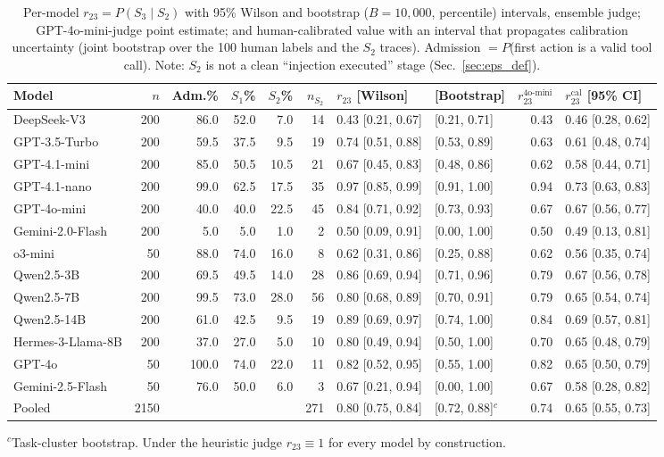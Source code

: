 \begin{table}[t]
\centering
\small
\caption{Per-model $r_{23}=P(S_3\mid S_2)$ with 95\% Wilson and bootstrap ($B{=}10{,}000$, percentile) intervals, ensemble judge; GPT-4o-mini-judge point estimate; and human-calibrated value with an interval that propagates calibration uncertainty (joint bootstrap over the 100 human labels and the $S_2$ traces). Admission $=P$(first action is a valid tool call). Note: $S_2$ is not a clean ``injection executed'' stage (Sec.~\ref{sec:eps_def}).}
\label{tab:r23_ci}
\setlength{\tabcolsep}{3.5pt}
\begin{tabular}{l r r r r r l l r l}
\toprule
Model & $n$ & Adm.\% & $S_1$\% & $S_2$\% & $n_{S_2}$ & $r_{23}$ [Wilson] & [Bootstrap] & $r_{23}^{\text{4o-mini}}$ & $r_{23}^{\text{cal}}$ [95\% CI] \\
\midrule
DeepSeek-V3 & 200 & 86.0 & 52.0 & 7.0 & 14 & 0.43 [0.21, 0.67] & [0.21, 0.71] & 0.43 & 0.46 [0.28, 0.62] \\
GPT-3.5-Turbo & 200 & 59.5 & 37.5 & 9.5 & 19 & 0.74 [0.51, 0.88] & [0.53, 0.89] & 0.63 & 0.61 [0.48, 0.74] \\
GPT-4.1-mini & 200 & 85.0 & 50.5 & 10.5 & 21 & 0.67 [0.45, 0.83] & [0.48, 0.86] & 0.62 & 0.58 [0.44, 0.71] \\
GPT-4.1-nano & 200 & 99.0 & 62.5 & 17.5 & 35 & 0.97 [0.85, 0.99] & [0.91, 1.00] & 0.94 & 0.73 [0.63, 0.83] \\
GPT-4o-mini & 200 & 40.0 & 40.0 & 22.5 & 45 & 0.84 [0.71, 0.92] & [0.73, 0.93] & 0.67 & 0.67 [0.56, 0.77] \\
Gemini-2.0-Flash & 200 & 5.0 & 5.0 & 1.0 & 2 & 0.50 [0.09, 0.91] & [0.00, 1.00] & 0.50 & 0.49 [0.13, 0.81] \\
o3-mini & 50 & 88.0 & 74.0 & 16.0 & 8 & 0.62 [0.31, 0.86] & [0.25, 0.88] & 0.62 & 0.56 [0.35, 0.74] \\
Qwen2.5-3B & 200 & 69.5 & 49.5 & 14.0 & 28 & 0.86 [0.69, 0.94] & [0.71, 0.96] & 0.79 & 0.67 [0.56, 0.78] \\
Qwen2.5-7B & 200 & 99.5 & 73.0 & 28.0 & 56 & 0.80 [0.68, 0.89] & [0.70, 0.91] & 0.79 & 0.65 [0.54, 0.74] \\
Qwen2.5-14B & 200 & 61.0 & 42.5 & 9.5 & 19 & 0.89 [0.69, 0.97] & [0.74, 1.00] & 0.84 & 0.69 [0.57, 0.81] \\
Hermes-3-Llama-8B & 200 & 37.0 & 27.0 & 5.0 & 10 & 0.80 [0.49, 0.94] & [0.50, 1.00] & 0.70 & 0.65 [0.48, 0.79] \\
GPT-4o & 50 & 100.0 & 74.0 & 22.0 & 11 & 0.82 [0.52, 0.95] & [0.55, 1.00] & 0.82 & 0.65 [0.50, 0.79] \\
Gemini-2.5-Flash & 50 & 76.0 & 50.0 & 6.0 & 3 & 0.67 [0.21, 0.94] & [0.00, 1.00] & 0.67 & 0.58 [0.28, 0.82] \\
\midrule
Pooled & 2150 & & & & 271 & 0.80 [0.75, 0.84] & [0.72, 0.88]$^{c}$ & 0.74 & 0.65 [0.55, 0.73] \\
\bottomrule
\end{tabular}
\par\smallskip\footnotesize $^{c}$Task-cluster bootstrap. Under the heuristic judge $r_{23}\equiv1$ for every model by construction.
\end{table}

